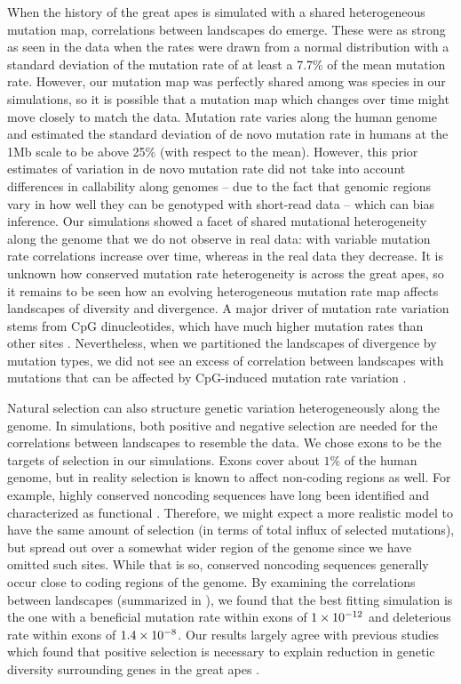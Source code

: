 When the history of the great apes is simulated with a shared heterogeneous mutation map,
correlations between landscapes do emerge.
These were as strong as seen in the data when the rates were drawn from a normal distribution
with a standard deviation of the mutation rate of at least a 7.7\% of the mean mutation rate.
However, our mutation map was perfectly shared among was species in our simulations,
so it is possible that a mutation map which changes over time might move closely to match the data.
Mutation rate varies along the human genome 
and \citet{smith_large_2018} estimated the standard deviation of de novo mutation rate in humans at the 1Mb scale to be above 25\% (with respect to the mean).
However, this prior estimates of variation in de novo mutation rate did not take into account differences in callability along genomes
-- due to the fact that genomic regions vary in how well they can be genotyped with short-read data --
which can bias inference.
Our simulations showed a facet of shared mutational heterogeneity along the genome
that we do not observe in real data: with variable mutation rate correlations increase over time,
whereas in the real data they decrease.
It is unknown how conserved mutation rate heterogeneity is across the great apes,
so it remains to be seen how an evolving heterogeneous mutation rate map affects landscapes of diversity and divergence.
A major driver of mutation rate variation stems from CpG dinucleotides,
which have much higher mutation rates than other sites \citep{agarwal_mutation_2021, nachman_estimate_2000, hodgkinson_variation_2011}.
Nevertheless, when we partitioned the landscapes of divergence by mutation types,
we did not see an excess of correlation between landscapes with mutations
that can be affected by CpG-induced mutation rate variation .

Natural selection can also structure genetic variation heterogeneously along the genome.
In simulations,
both positive and negative selection are needed for the correlations between landscapes to resemble the data.
We chose exons to be the targets of selection in our simulations.
Exons cover about $1\%$ of the human genome, 
but in reality selection is known to affect non-coding regions as well.
For example, highly conserved noncoding sequences have long been identified
and characterized as functional \citep{bejerano_ultraconserved_2004, siepel_evolutionarily_2005, katzman_human_2007}.
Therefore, we might expect a more realistic model to have the same amount of selection (in terms of total influx of selected mutations),
but spread out over a somewhat wider region of the genome since we have omitted such sites.
While that is so, conserved noncoding sequences generally occur close to coding regions
of the genome.
By examining the correlations between landscapes (summarized in ),
we found that the best fitting simulation is the one with a beneficial mutation rate within exons of ${1}\times10^{-12}$ and deleterious rate within exons of ${1.4}\times10^{-8}$.
Our results largely agree with previous studies which found that positive selection is necessary to explain reduction in genetic diversity surrounding genes in the great apes \citep{nam_extreme_2015, nam_evidence_2017}.

